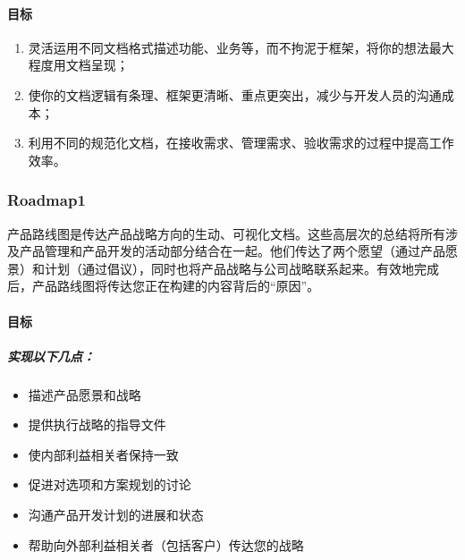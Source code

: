 \documentclass[letterpaper,11pt,english]{sphinxmanual}
\begin{document}
\paragraph{目标}
\label{\detokenize{chapter_project/product_document:id3}}\begin{enumerate}
%
\item {} 
灵活运用不同文档格式描述功能、业务等，而不拘泥于框架，将你的想法最大程度用文档呈现；

\item {} 
使你的文档逻辑有条理、框架更清晰、重点更突出，减少与开发人员的沟通成本；

\item {} 
利用不同的规范化文档，在接收需求、管理需求、验收需求的过程中提高工作效率。

\end{enumerate}


\subsubsection{Roadmap1\sphinxfootnotemark[276]}
\label{\detokenize{chapter_project/Roadmap:roadmap1}}\label{\detokenize{chapter_project/Roadmap::doc}}%
\begin{footnotetext}[276]\sphinxAtStartFootnote
{}
%
\end{footnotetext}\ignorespaces 
产品路线图是传达产品战略方向的生动、可视化文档。这些高层次的总结将所有涉及产品管理和产品开发的活动部分结合在一起。他们传达了两个愿望（通过产品愿景）和计划（通过倡议），同时也将产品战略与公司战略联系起来。有效地完成后，产品路线图将传达您正在构建的内容背后的“原因”。


\paragraph{目标}
\label{\detokenize{chapter_project/Roadmap:id1}}

\subparagraph{实现以下几点：}
\label{\detokenize{chapter_project/Roadmap:id2}}\begin{itemize}
\item {} 
描述产品愿景和战略

\item {} 
提供执行战略的指导文件

\item {} 
使内部利益相关者保持一致

\item {} 
促进对选项和方案规划的讨论

\item {} 
沟通产品开发计划的进展和状态

\item {} 
帮助向外部利益相关者（包括客户）传达您的战略

\end{itemize}
\end{document}
